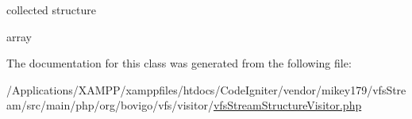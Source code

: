 collected structure

array 

The documentation for this class was generated from the following file\+:\begin{DoxyCompactItemize}
\item 
/\+Applications/\+X\+A\+M\+P\+P/xamppfiles/htdocs/\+Code\+Igniter/vendor/mikey179/vfs\+Stream/src/main/php/org/bovigo/vfs/visitor/\mbox{\hyperlink{vfs_stream_structure_visitor_8php}{vfs\+Stream\+Structure\+Visitor.\+php}}\end{DoxyCompactItemize}
